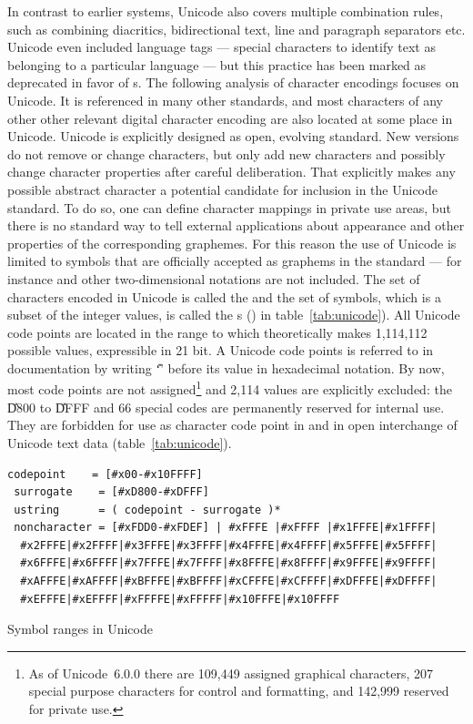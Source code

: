 In contrast to earlier systems, Unicode also covers multiple combination
rules, such as combining diacritics, bidirectional text, line and paragraph
separators etc. Unicode even included language tags --- special characters to
identify text as belonging to a particular language --- but this practice has
been marked as deprecated in favor of s. The following
analysis of character encodings focuses on Unicode. It is referenced in many
other standards, and most characters of any other other relevant digital
character encoding are also located at some place in Unicode. Unicode is
explicitly designed as open, evolving standard.  New versions do not remove or
change characters, but only add new characters and possibly change character
properties after careful deliberation. That explicitly makes any possible
abstract character a potential candidate for inclusion in the Unicode standard.
To do so, one can define character mappings in private use areas, but there is
no standard way to tell external applications about appearance and other
properties of the corresponding graphemes. For this reason the use of Unicode
is limited to symbols that are officially accepted as graphems in the standard
--- for instance  \cite{Sutton2002} and other
two-dimensional notations are not included.  The set of characters encoded in
Unicode is called the  and the set of
symbols, which is a subset of the integer values, is called the s () in table~\ref{tab:unicode}).  All Unicode
code points are located in the range  to  which theoretically
makes 1,114,112 possible values, expressible in 21 bit. A Unicode code points
is referred to in documentation by writing `\U{}' before its value in
hexadecimal notation. By now, most code points are not assigned\footnote{As of
Unicode~6.0.0 there are 109,449 assigned graphical characters, 207 special
purpose characters for control and formatting, and 142,999 reserved for private
use.} and 2,114 values are explicitly excluded: the  \U{D800}
to \U{DFFF} and 66 special  codes  are permanently
reserved for internal use. They are forbidden for use as character code point
in  and in open interchange of Unicode text data
(table~\ref{tab:unicode}).


\begin{table}[ht]
\begin{lstlisting}[language=BNF]
 codepoint    = [#x00-#x10FFFF]
 surrogate    = [#xD800-#xDFFF]
 ustring      = ( codepoint - surrogate )*
 noncharacter = [#xFDD0-#xFDEF] | #xFFFE |#xFFFF |#x1FFFE|#x1FFFF|
  #x2FFFE|#x2FFFF|#x3FFFE|#x3FFFF|#x4FFFE|#x4FFFF|#x5FFFE|#x5FFFF| 
  #x6FFFE|#x6FFFF|#x7FFFE|#x7FFFF|#x8FFFE|#x8FFFF|#x9FFFE|#x9FFFF| 
  #xAFFFE|#xAFFFF|#xBFFFE|#xBFFFF|#xCFFFE|#xCFFFF|#xDFFFE|#xDFFFF|
  #xEFFFE|#xEFFFF|#xFFFFE|#xFFFFF|#x10FFFE|#x10FFFF
\end{lstlisting}
\caption{Symbol ranges in Unicode}
\label{tab:unicode}
\end{table}

